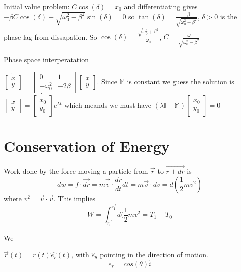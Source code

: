 \documentclass{homework}
\newcommand{\MM}{\mathbb{M}}
\newcommand{\m}[1]{\begin{bmatrix} #1 \end{bmatrix}}
\begin{document}
Initial value problem: $C\cos(\delta) = x_0$ and differentiating gives $-\beta C \cos (\delta) - \sqrt{\omega_0^2 - \beta^2}\sin (\delta) =0$ so $\tan(\delta) = \frac{-\beta}{\sqrt{\omega_0^2 - \beta^2}}$, $\delta >0$ is the phase lag from dissapation. So $\cos (\delta) = \frac{\sqrt{\omega_0^2 + \beta^2}}{\omega_0}$, $C = \frac{\omega}{\sqrt{\omega_0^2 - \beta^2}}$



Phase space interperatation

$\dot{\m{x \\ y}} = \m{0 & 1 \\ -\omega_0^2 & -2\beta} \m{x \\ y}$. Since $\MM$ is constant we guess the solution is $\dot{\m{x \\ y}} = \dot{\m{x_0 \\ y_0}}e^{\lambda t}$ which meands we must have $(\lambda \mathbb{I} - \mathbb{M})\m{x_0 \\ y_0} = 0$






\section{Conservation of Energy}

Work done by the force moving a particle from $\vec{r}$ to $\vec{r + dr}$ is 
\[dw = f\cdot \vec{dr} = m\vec{\dot{v}} \cdot \frac{dr}{dt}dt = m\vec{v} \cdot dv = d(\frac{1}{2}mv^2) \]
where $v^2 = \vec{v} \cdot \vec{v}$. This implies 
\[W = \int_{\vec{r_0}}^{\vec{r_1}}d(\frac{1}{2}mv^2 = T_1 - T_0 \]





We 





$\vec{r}(t) = r(t)\hat{e_r}(t)$, with $\hat e_{\theta}$ pointing in the direction of motion.
\[e_r = cos(\theta)\hat i\]
\end{document}
